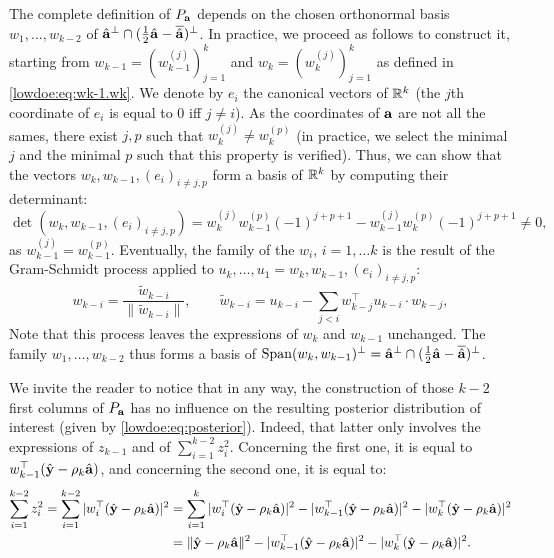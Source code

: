 {The complete definition of $P_{\mathbf{a}}$ depends on the chosen orthonormal basis $w_1,\dots,w_{k-2}$ of $\hat{\mathbf{a}}^\perp\cap(\frac{1}{2}\hat{\mathbf{a}}-\overline{\hat{\mathbf{a}}})^\perp$.
In practice, we proceed as follows to construct it, starting from $w_{k-1}=(w_{k-1}^{(j)})_{j=1}^k$ and $w_k=(w_k^{(j)})_{j=1}^k$ as defined in \cref{lowdoe:eq:wk-1.wk}. 
We denote by $e_i$ the canonical vectors of $\mathbb{R}^k$ (the $j$th coordinate of $e_i$ is equal to $0$ iff $j\ne i$). As the coordinates of $\mathbf{a}$ are not all the sames, there exist $j,p$ such that $w_{k}^{(j)}\ne w_{k}^{(p)}$ (in practice, we select the minimal $j$ and the minimal $p$ such that this property is verified). Thus, we can show that the vectors $w_k,w_{k-1},(e_i)_{i\ne j,p}$ form a basis of $\mathbb{R}^k$ by computing their determinant:
    \begin{equation}
        \det(w_k,w_{k-1},(e_i)_{i\ne j,p}) = w_k^{(j)}w_{k-1}^{(p)}(-1)^{j+p+1} - w_{k-1}^{(j)}w_k^{(p)}(-1)^{j+p+1}\ne 0,
    \end{equation}
as $w_{k-1}^{(j)}=w_{k-1}^{(p)}$.
Eventually, the family of the $w_i,\,i=1,\dots k$ is the result of the Gram-Schmidt process applied to $u_k,\dots,u_1=w_k,w_{k-1},(e_i)_{i\ne j,p}$: 
    \begin{equation}
        w_{k-i} = \frac{\tilde w_{k-i}}{\|\tilde w_{k-i}\|},\qquad \tilde w_{k-i} = u_{k-i} - \sum_{j<i} w_{k-j}^{\top}u_{k-i}\cdot w_{k-j}, 
    \end{equation}
Note that this process leaves the expressions of $w_k$ and $w_{k-1}$ unchanged. The family $w_1,\dots,w_{k-2}$ thus forms a basis of $\operatorname{Span}(w_k,w_{k-1})^\perp=\hat{\mathbf{a}}^\perp\cap(\frac{1}{2}\hat{\mathbf{a}}-\overline{\hat{\mathbf{a}}})^\perp$.

We invite the reader to notice that in any way, the construction of those $k-2$ first columns of $P_{\mathbf{a}}$ has no influence on the resulting posterior distribution of interest (given by \cref{lowdoe:eq:posterior}). Indeed, that latter only involves the expressions of $z_{k-1}$ and of $\sum_{i=1}^{k-2}z_i^2$. Concerning the first one, it is equal to $w_{k-1}^{\top}(\hat{\mathbf{y}}-\rho_k\hat{\mathbf{a}})$, and concerning the second one, it is equal to:
    \begin{align*}
            \sum_{i=1}^{k-2}z_i^2=\sum_{i=1}^{k-2}|w_i^{\top}(\hat{\mathbf{y}}-\rho_k\hat{\mathbf{a}})|^2&=\sum_{i=1}^{k}|w_i^{\top}(\hat{\mathbf{y}}-\rho_k\hat{\mathbf{a}})|^2-|w_{k-1}^{\top}(\hat{\mathbf{y}}-\rho_k\hat{\mathbf{a}} )|^2-|w_k^{\top}(\hat{\mathbf{y}}-\rho_k\hat{\mathbf{a}} )|^2\\
                &=\|\hat{\mathbf{y}}-\rho_k\hat{\mathbf{a}}\|^2-|w_{k-1}^{\top}(\hat{\mathbf{y}}-\rho_k\hat{\mathbf{a}} )|^2-|w_k^{\top}(\hat{\mathbf{y}}-\rho_k\hat{\mathbf{a}} )|^2.
        \end{align*}
    }




